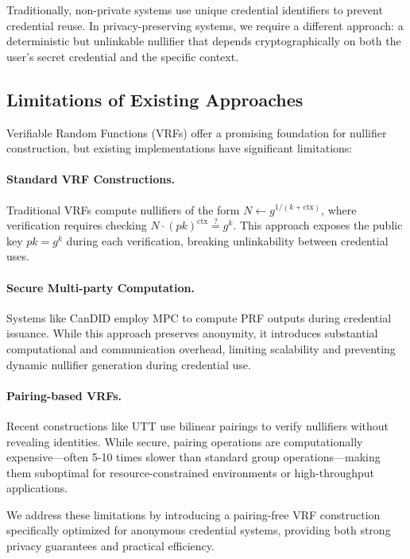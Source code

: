 Traditionally, non-private systems use unique credential identifiers to prevent credential reuse. In privacy-preserving systems, we require a different approach: a deterministic but unlinkable nullifier that depends cryptographically on both the user's secret credential and the specific context.

\subsection{Limitations of Existing Approaches}

Verifiable Random Functions (VRFs) offer a promising foundation for nullifier construction, but existing implementations have significant limitations:

\paragraph{Standard VRF Constructions.} Traditional VRFs compute nullifiers of the form $N \leftarrow g^{1/(k+\text{ctx})}$, where verification requires checking $N \cdot (pk)^{\text{ctx}} \stackrel{?}{=} g^k$. This approach exposes the public key $pk = g^k$ during each verification, breaking unlinkability between credential uses.

\paragraph{Secure Multi-party Computation.} Systems like CanDID employ MPC to compute PRF outputs during credential issuance. While this approach preserves anonymity, it introduces substantial computational and communication overhead, limiting scalability and preventing dynamic nullifier generation during credential use.

\paragraph{Pairing-based VRFs.} Recent constructions like UTT use bilinear pairings to verify nullifiers without revealing identities. While secure, pairing operations are computationally expensive—often 5-10 times slower than standard group operations—making them suboptimal for resource-constrained environments or high-throughput applications.

We address these limitations by introducing a pairing-free VRF construction specifically optimized for anonymous credential systems, providing both strong privacy guarantees and practical efficiency.

